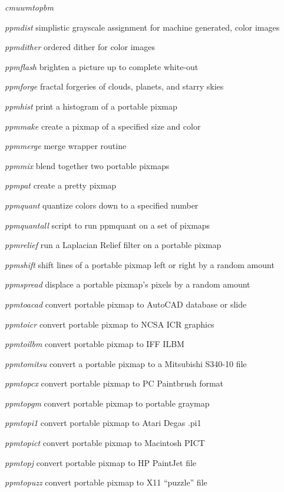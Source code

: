 \begin{TPlist}{{\it cmuwmtopbm}}
\item[{{\it ppmdist}}]
simplistic grayscale assignment for machine generated, color images
\item[{{\it ppmdither}}]
ordered dither for color images
\item[{{\it ppmflash}}]
brighten a picture up to complete white-out
\item[{{\it ppmforge}}]
fractal forgeries of clouds, planets, and starry skies
\item[{{\it ppmhist}}]
print a histogram of a portable pixmap
\item[{{\it ppmmake}}]
create a pixmap of a specified size and color
\item[{{\it ppmmerge}}]
merge wrapper routine
\item[{{\it ppmmix}}]
blend together two portable pixmaps
\item[{{\it ppmpat}}]
create a pretty pixmap
\item[{{\it ppmquant}}]
quantize colors down to a specified number
\item[{{\it ppmquantall}}]
script to run ppmquant on a set of pixmaps
\item[{{\it ppmrelief}}]
run a Laplacian Relief filter on a portable pixmap
\item[{{\it ppmshift}}]
shift lines of a portable pixmap left or right by a random amount
\item[{{\it ppmspread}}]
displace a portable pixmap's pixels by a random amount
\item[{{\it ppmtoacad}}]
convert portable pixmap to AutoCAD database or slide
\item[{{\it ppmtoicr}}]
convert portable pixmap to NCSA ICR graphics
\item[{{\it ppmtoilbm}}]
convert portable pixmap to IFF ILBM
\item[{{\it ppmtomitsu}}]
convert a portable pixmap to a Mitsubishi S340-10 file
\item[{{\it ppmtopcx}}]
convert portable pixmap to PC Paintbrush format
\item[{{\it ppmtopgm}}]
convert portable pixmap to portable graymap
\item[{{\it ppmtopi1}}]
convert portable pixmap to Atari Degas .pi1
\item[{{\it ppmtopict}}]
convert portable pixmap to Macintosh PICT
\item[{{\it ppmtopj}}]
convert portable pixmap to HP PaintJet file
\item[{{\it ppmtopuzz}}]
convert portable pixmap to X11 ``puzzle'' file

\end{TPlist}
